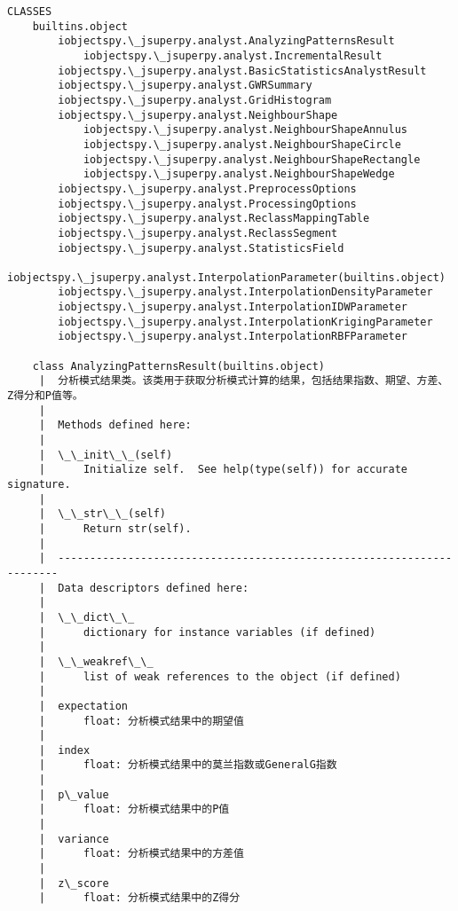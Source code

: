 \documentclass[11pt]{article}
\begin{document}
\begin{Verbatim}[commandchars=\\\{\}]
CLASSES
    builtins.object
        iobjectspy.\_jsuperpy.analyst.AnalyzingPatternsResult
            iobjectspy.\_jsuperpy.analyst.IncrementalResult
        iobjectspy.\_jsuperpy.analyst.BasicStatisticsAnalystResult
        iobjectspy.\_jsuperpy.analyst.GWRSummary
        iobjectspy.\_jsuperpy.analyst.GridHistogram
        iobjectspy.\_jsuperpy.analyst.NeighbourShape
            iobjectspy.\_jsuperpy.analyst.NeighbourShapeAnnulus
            iobjectspy.\_jsuperpy.analyst.NeighbourShapeCircle
            iobjectspy.\_jsuperpy.analyst.NeighbourShapeRectangle
            iobjectspy.\_jsuperpy.analyst.NeighbourShapeWedge
        iobjectspy.\_jsuperpy.analyst.PreprocessOptions
        iobjectspy.\_jsuperpy.analyst.ProcessingOptions
        iobjectspy.\_jsuperpy.analyst.ReclassMappingTable
        iobjectspy.\_jsuperpy.analyst.ReclassSegment
        iobjectspy.\_jsuperpy.analyst.StatisticsField
    iobjectspy.\_jsuperpy.analyst.InterpolationParameter(builtins.object)
        iobjectspy.\_jsuperpy.analyst.InterpolationDensityParameter
        iobjectspy.\_jsuperpy.analyst.InterpolationIDWParameter
        iobjectspy.\_jsuperpy.analyst.InterpolationKrigingParameter
        iobjectspy.\_jsuperpy.analyst.InterpolationRBFParameter
    
    class AnalyzingPatternsResult(builtins.object)
     |  分析模式结果类。该类用于获取分析模式计算的结果，包括结果指数、期望、方差、Z得分和P值等。
     |  
     |  Methods defined here:
     |  
     |  \_\_init\_\_(self)
     |      Initialize self.  See help(type(self)) for accurate signature.
     |  
     |  \_\_str\_\_(self)
     |      Return str(self).
     |  
     |  ----------------------------------------------------------------------
     |  Data descriptors defined here:
     |  
     |  \_\_dict\_\_
     |      dictionary for instance variables (if defined)
     |  
     |  \_\_weakref\_\_
     |      list of weak references to the object (if defined)
     |  
     |  expectation
     |      float: 分析模式结果中的期望值
     |  
     |  index
     |      float: 分析模式结果中的莫兰指数或GeneralG指数
     |  
     |  p\_value
     |      float: 分析模式结果中的P值
     |  
     |  variance
     |      float: 分析模式结果中的方差值
     |  
     |  z\_score
     |      float: 分析模式结果中的Z得分
    

\end{Verbatim}
\end{document}
